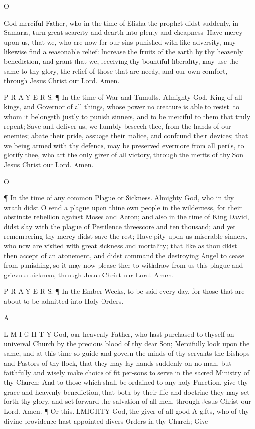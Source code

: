 O

God merciful Father, who in the time of Elisha the prophet didst suddenly, in Samaria, turn great scarcity and dearth into plenty and cheapness; Have mercy upon us, that we, who are now for our sins punished with like adversity, may likewise find a seasonable relief: Increase the fruits of the earth by thy heavenly benediction, and grant that we, receiving thy bountiful liberality, may use the same to thy glory, the relief of those that are needy, and our own comfort, through Jesus Christ our Lord. Amen.

P R A Y E R S. ¶ In the time of War and Tumults. Almighty God, King of all kings, and Governor of all things, whose power no creature is able to resist, to whom it belongeth justly to punish sinners, and to be merciful to them that truly repent; Save and deliver us, we humbly beseech thee, from the hands of our enemies; abate their pride, assuage their malice, and confound their devices; that we being armed with thy defence, may be preserved evermore from all perils, to glorify thee, who art the only giver of all victory, through the merits of thy Son Jesus Christ our Lord. Amen.

O

¶ In the time of any common Plague or Sickness. Almighty God, who in thy wrath didst O send a plague upon thine own people in the wilderness, for their obstinate rebellion against Moses and Aaron; and also in the time of King David, didst slay with the plague of Pestilence threescore and ten thousand; and yet remembering thy mercy didst save the rest; Have pity upon us miserable sinners, who now are visited with great sickness and mortality; that like as thou didst then accept of an atonement, and didst command the destroying Angel to cease from punishing, so it may now please thee to withdraw from us this plague and grievous sickness, through Jesus Christ our Lord. Amen.

P R A Y E R S. ¶ In the Ember Weeks, to be said every day, for those that are about to be admitted into Holy Orders.

A

L M I G H T Y God, our heavenly Father, who hast purchased to thyself an universal Church by the precious blood of thy dear Son; Mercifully look upon the same, and at this time so guide and govern the minds of thy servants the Bishops and Pastors of thy flock, that they may lay hands suddenly on no man, but faithfully and wisely make choice of fit per-sons to serve in the sacred Ministry of thy Church: And to those which shall be ordained to any holy Function, give thy grace and heavenly benediction, that both by their life and doctrine they may set forth thy glory, and set forward the salvation of all men, through Jesus Christ our Lord. Amen. ¶ Or this. LMIGHTY God, the giver of all good A gifts, who of thy divine providence hast appointed divers Orders in thy Church; Give

